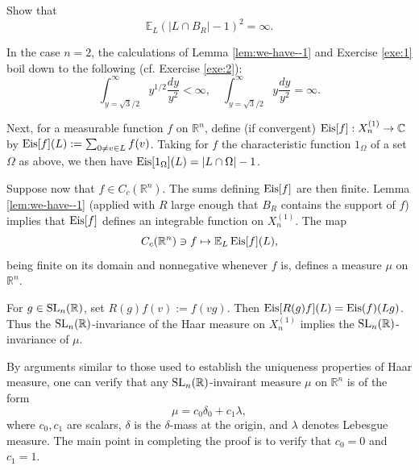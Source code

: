 \documentclass[reqno]{amsart} 
\begin{document}
\begin{exercise}\label{exe:1}
  Show that
  \begin{equation*}
    \mathbb{E}_{L} (|L \cap B_R| - 1)^2 = \infty.
  \end{equation*}
\end{exercise}

\begin{remark}
  In the case $n=2$, the calculations of Lemma \ref{lem:we-have--1} and Exercise \ref{exe:1} boil down to the following (cf. Exercise \ref{exe:2}):
  \begin{equation*}
    \int _{y = \sqrt{3}/2}^{\infty} y^{1/2} \frac{d y}{y^2} < \infty, \quad \int _{y = \sqrt{3}/2}^{\infty} y \frac{d y}{y^2} = \infty.
  \end{equation*}
\end{remark}

Next, for a measurable function $f$ on $\mathbb{R}^n$, define (if convergent) $\operatorname{Eis}[f] : X_n^{(1)} \rightarrow \mathbb{C}$ by $\operatorname{Eis}[f](L) := \sum _{0 \neq v \in L} f(v)$.  Taking for $f$ the characteristic function $1_{\Omega}$ of a set $\Omega$ as above, we then have $\operatorname{Eis}[1_{\Omega}](L) = |L \cap \Omega| - 1$.

Suppose now that $f \in C_c(\mathbb{R}^n)$.  The sums defining $\operatorname{Eis}[f]$ are then finite.  Lemma \ref{lem:we-have--1} (applied with $R$ large enough that $B_R$ contains the support of $f$) implies that $\operatorname{Eis}[f]$ defines an integrable function on $X_n^{(1)}$.  The map
\begin{equation*}
  C_c(\mathbb{R}^n) \ni f \mapsto \mathbb{E} _{L} \operatorname{Eis}[f](L),
\end{equation*}
being finite on its domain and nonnegative whenever $f$ is, defines a measure $\mu$ on $\mathbb{R}^n$.

For $g \in \operatorname{SL}_n(\mathbb{R})$, set $R(g) f(v) := f(v g)$.  Then $\operatorname{Eis}[R(g) f](L) = \operatorname{Eis}(f)(L g)$.  Thus the $\operatorname{SL}_n(\mathbb{R})$-invariance of the Haar measure on $X_n^{(1)}$ implies the $\operatorname{SL}_n(\mathbb{R})$-invariance of $\mu$.

By arguments similar to those used to establish the uniqueness properties of Haar measure, one can verify that any $\operatorname{SL}_n(\mathbb{R})$-invairant measure $\mu$ on $\mathbb{R}^n$ is of the form
\begin{equation}\label{eq:mu-=-c}
  \mu = c _0 \delta _0 + c _1  \lambda,
\end{equation}
where $c_0,c_1$ are scalars, $\delta$ is the $\delta$-mass at the origin, and $\lambda$ denotes Lebesgue measure.  The main point in completing the proof is to verify that $c_0 = 0$ and $c_1 = 1$.
\end{document}
